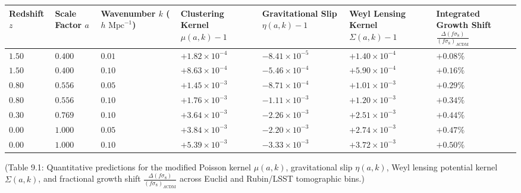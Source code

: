 \documentclass[aps,prd,onecolumn,superscriptaddress,nofootinbib,longbibliography,10pt]{revtex4-2}
\begin{document}
  
\begin{center}
\begin{tabular}{|lllllll|}
\hline

      Redshift \(z\) & Scale Factor \(a\) & Wavenumber \(k\) (\(h\text{ Mpc}^{-1}\)) & Clustering Kernel \(\mu(a,k) - 1\) & Gravitational Slip \(\eta(a,k) - 1\) & Weyl Lensing Kernel \(\Sigma(a,k) - 1\) & Integrated Growth Shift \(\displaystyle\frac{\Delta(f\sigma_{8})}{(f\sigma_{8})_{\Lambda\mathrm{CDM}}}\)  \\ \hline
   \(1.50\) & \(0.400\) & \(0.01\) & \(+1.82 \times 10^{-4}\) & \(-8.41 \times 10^{-5}\) & \(+1.40 \times 10^{-4}\) & \(+0.08\%\) \\ \hline

      \(1.50\) & \(0.400\) & \(0.10\) & \(+8.63 \times 10^{-4}\) & \(-5.46 \times 10^{-4}\) & \(+5.90 \times 10^{-4}\) & \(+0.16\%\) \\ \hline

      \(0.80\) & \(0.556\) & \(0.05\) & \(+1.45 \times 10^{-3}\) & \(-8.71 \times 10^{-4}\) & \(+1.01 \times 10^{-3}\) & \(+0.29\%\) \\ \hline

      \(0.80\) & \(0.556\) & \(0.10\) & \(+1.76 \times 10^{-3}\) & \(-1.11 \times 10^{-3}\) & \(+1.20 \times 10^{-3}\) & \(+0.34\%\) \\ \hline

      \(0.30\) & \(0.769\) & \(0.10\) & \(+3.64 \times 10^{-3}\) & \(-2.26 \times 10^{-3}\) & \(+2.51 \times 10^{-3}\) & \(+0.44\%\) \\ \hline

      \(0.00\) & \(1.000\) & \(0.05\) & \(+3.84 \times 10^{-3}\) & \(-2.20 \times 10^{-3}\) & \(+2.74 \times 10^{-3}\) & \(+0.47\%\) \\ \hline

      \(0.00\) & \(1.000\) & \(0.10\) & \(+5.39 \times 10^{-3}\) & \(-3.33 \times 10^{-3}\) & \(+3.72 \times 10^{-3}\) & \(+0.50\%\) \\ \hline

    
  \end{tabular}
\end{center}

  (Table 9.1: Quantitative predictions for the modified Poisson kernel \(\mu(a,k)\), gravitational slip \(\eta(a,k)\), Weyl lensing potential kernel \(\Sigma(a,k)\), and fractional growth shift \(\displaystyle\frac{\Delta(f\sigma_{8})}{(f\sigma_{8})_{\Lambda\mathrm{CDM}}}\) across Euclid and Rubin/LSST tomographic bins.)
\end{document}
